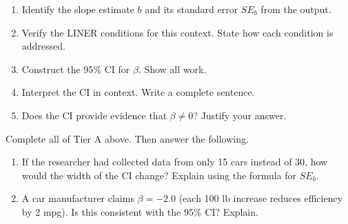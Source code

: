 \documentclass[10pt]{article}
\begin{document}
\begin{tcolorbox}[colback=white, colframe=black!40,
    title=\textbf{Tier A --- Approaching Proficiency},
    fonttitle=\bfseries, arc=2mm, left=3mm, right=3mm, top=2mm, bottom=2mm]

\begin{enumerate}[label=\alph*.]

    \item Identify the slope estimate $b$ and its standard error $SE_b$ from the output.

    \item Verify the LINER conditions for this context.
          State how each condition is addressed.

    \item Construct the 95\% CI for $\beta$. Show all work.

    \item Interpret the CI in context. Write a complete sentence.

    \item Does the CI provide evidence that $\beta \ne 0$? Justify your answer.

\end{enumerate}
\end{tcolorbox}

\begin{tcolorbox}[colback=white, colframe=black!40,
    title=\textbf{Tier E --- Extension},
    fonttitle=\bfseries, arc=2mm, left=3mm, right=3mm, top=2mm, bottom=2mm]

Complete all of Tier A above. Then answer the following.

\begin{enumerate}[label=\alph*., start=6]

    \item If the researcher had collected data from only 15 cars instead of 30, how
          would the width of the CI change? Explain using the formula for $SE_b$.

    \item A car manufacturer claims $\beta = -2.0$ (each 100 lb increase reduces
          efficiency by 2 mpg). Is this consistent with the 95\% CI? Explain.

\end{enumerate}
\end{tcolorbox}
\end{document}
